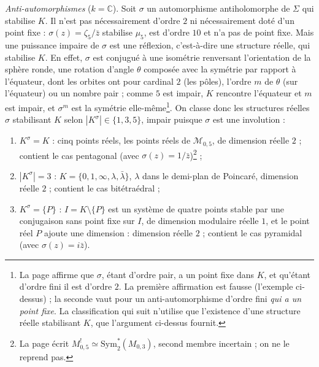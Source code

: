 \documentclass[11pt,a4paper]{article}
\begin{document}
\emph{Anti-automorphismes} ($k = \mathbb{C}$). Soit $\sigma$ un automorphisme
antiholomorphe de $\Sigma$ qui stabilise $K$. Il n'est pas nécessairement
d'ordre $2$ ni nécessairement doté d'un point fixe : $\sigma(z) = \zeta_5/\bar
z$ stabilise $\mu_5$, est d'ordre $10$ et n'a pas de point fixe. Mais une
puissance impaire de $\sigma$ est une réflexion, c'est-à-dire une structure réelle, qui
stabilise $K$. En effet, $\sigma$ est conjugué à une isométrie renversant l'orientation
de la sphère ronde, une rotation d'angle $\theta$ composée avec la symétrie par
rapport à l'équateur, dont les orbites ont pour cardinal $2$ (les pôles),
l'ordre $m$ de $\theta$ (sur l'équateur) ou un nombre pair ; comme $5$ est
impair, $K$ rencontre l'équateur et $m$ est impair, et $\sigma^{m}$ est la
symétrie elle-même\footnote{La page affirme que $\sigma$, étant d'ordre pair, a
un point fixe dans $K$, et qu'étant d'ordre fini il est d'ordre $2$. La première
affirmation est fausse (l'exemple ci-dessus) ; la seconde vaut pour un
anti-automorphisme d'ordre fini \emph{qui a un point fixe}. La classification
qui suit n'utilise que l'existence d'une structure réelle stabilisant $K$, que
l'argument ci-dessus fournit.}. On classe donc les structures réelles
$\sigma$ stabilisant $K$ selon $|K^{\sigma}| \in \{1, 3, 5\}$, impair puisque
$\sigma$ est une involution :

\begin{enumerate}
\item[a)] $K^{\sigma} = K$ : cinq points réels, les points réels de
$\mathcal{M}_{0,5}$, de dimension réelle $2$ ; contient le cas pentagonal (avec
$\sigma(z) = 1/\bar z$)\footnote{La page écrit $M^{!}_{0,5} \simeq
\mathrm{Sym}^{*}_{2}(M_{0,3})$, second membre incertain ; on ne le reprend pas.} ;
\item[b)] $|K^{\sigma}| = 3$ : $K = \{0, 1, \infty, \lambda, \bar\lambda\}$,
$\lambda$ dans le demi-plan de Poincaré, dimension réelle $2$ ; contient le cas
bitétraédral ;
\item[c)] $K^{\sigma} = \{P\}$ : $I = K \setminus \{P\}$ est un système de
quatre points stable par une conjugaison sans point fixe sur $I$, de dimension
modulaire réelle $1$, et le point réel $P$ ajoute une dimension : dimension
réelle $2$ ; contient le cas pyramidal (avec $\sigma(z) = i\bar z$).
\end{enumerate}
\end{document}
